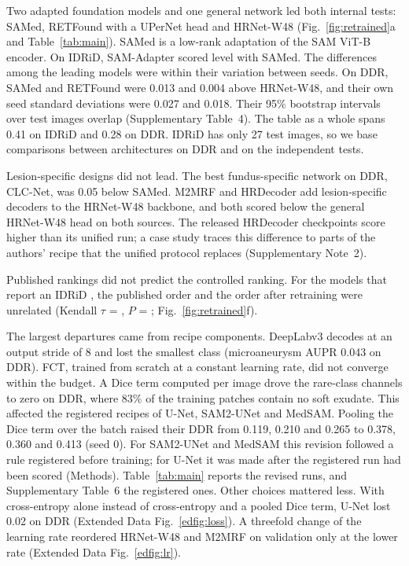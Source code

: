 Two adapted foundation models and one general network led both internal tests: SAMed, RETFound with a UPerNet head\cite{xiao2018upernet} and HRNet-W48 (Fig.~\ref{fig:retrained}a and Table~\ref{tab:main}). SAMed is a low-rank adaptation\cite{hu2022lora} of the SAM ViT-B\cite{dosovitskiy2021vit} encoder. On IDRiD, SAM-Adapter scored level with SAMed. The differences among the leading models were within their variation between seeds. On DDR, SAMed and RETFound were 0.013 and 0.004 above HRNet-W48, and their own seed standard deviations were 0.027 and 0.018. Their 95\% bootstrap intervals over test images overlap (Supplementary Table~4). The table as a whole spans 0.41 \mAUPR{} on IDRiD and 0.28 on DDR. IDRiD has only 27 test images, so we base comparisons between architectures on DDR and on the independent tests.

Lesion-specific designs did not lead. The best fundus-specific network on DDR, CLC-Net, was 0.05 below SAMed. M2MRF and HRDecoder add lesion-specific decoders to the HRNet-W48 backbone, and both scored below the general HRNet-W48 head on both sources. The released HRDecoder checkpoints score higher than its unified run; a case study traces this difference to parts of the authors' recipe that the unified protocol replaces (Supplementary Note~2).

Published rankings did not predict the controlled ranking. For the  models that report an IDRiD \mAUPR, the published order and the order after retraining were unrelated (Kendall $\tau$ = , $P$ = ; Fig.~\ref{fig:retrained}f).

The largest departures came from recipe components. DeepLabv3 decodes at an output stride of 8 and lost the smallest class (microaneurysm AUPR 0.043 on DDR). FCT, trained from scratch at a constant learning rate, did not converge within the budget. A Dice term computed per image drove the rare-class channels to zero on DDR, where 83\% of the training patches contain no soft exudate. This affected the registered recipes of U-Net, SAM2-UNet and MedSAM. Pooling the Dice term over the batch raised their DDR \mAUPR{} from 0.119, 0.210 and 0.265 to 0.378, 0.360 and 0.413 (seed 0). For SAM2-UNet and MedSAM this revision followed a rule registered before training; for U-Net it was made after the registered run had been scored (Methods). Table~\ref{tab:main} reports the revised runs, and Supplementary Table~6 the registered ones. Other choices mattered less. With cross-entropy alone instead of cross-entropy and a pooled Dice term, U-Net lost 0.02 on DDR (Extended Data Fig.~\ref{edfig:loss}). A threefold change of the learning rate reordered HRNet-W48 and M2MRF on validation only at the lower rate (Extended Data Fig.~\ref{edfig:lr}).

